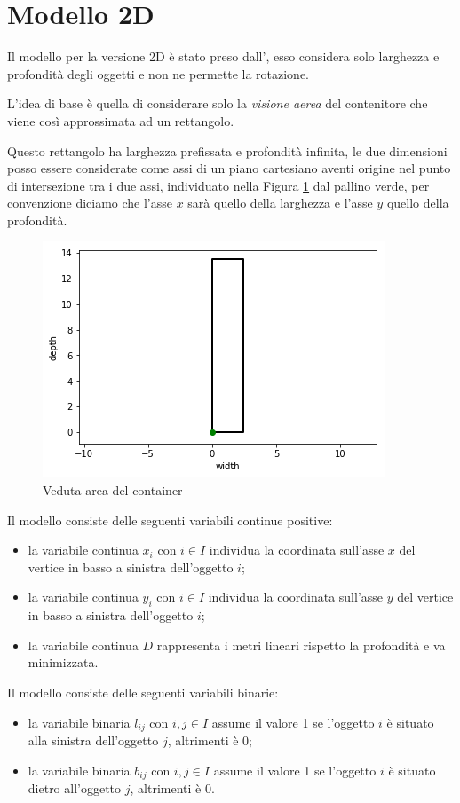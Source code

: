 \section{Modello 2D}
Il modello per la versione 2D è stato preso dall', esso considera solo larghezza e profondità degli oggetti e non ne permette la rotazione.

L'idea di base è quella di considerare solo la \textit{visione aerea} del contenitore che viene così approssimata ad un rettangolo.

Questo rettangolo ha larghezza prefissata e profondità infinita, le due dimensioni posso essere considerate come assi di un piano cartesiano aventi origine nel punto di intersezione tra i due assi, individuato nella Figura \ref{fig:veduta_aerea} dal pallino verde, per convenzione diciamo che l'asse $x$ sarà quello della larghezza e l'asse $y$ quello della profondità.
\begin{figure}[H]
	\begin{center} \includegraphics[scale=0.6]{figures/cartesian_wd}
		\caption[Veduta area - piano cartesiano]{Veduta area del container}  
		\label{fig:veduta_aerea}
	\end{center}
\end{figure}

\noindent Il modello consiste delle seguenti variabili continue positive:
\begin{itemize}
	\item la variabile continua $x_{i}$ con $i \in I$ individua la coordinata sull'asse $x$ del vertice in basso a sinistra dell'oggetto $i$;
	\item la variabile continua $y_{i}$ con $i \in I$ individua la coordinata sull'asse $y$ del vertice in basso a sinistra dell'oggetto $i$;
	\item la variabile continua $D$ rappresenta i metri lineari rispetto la profondità e va minimizzata.
\end{itemize}
Il modello consiste delle seguenti variabili binarie:
\begin{itemize}
	\item la variabile binaria $l_{ij}$ con $i,j \in I$ assume il valore 1 se l'oggetto $i$ è situato alla sinistra dell'oggetto $j$, altrimenti è 0;
	\item la variabile binaria $b_{ij}$ con $i,j \in I$ assume il valore 1 se l'oggetto $i$ è situato dietro all'oggetto $j$, altrimenti è 0.
\end{itemize}

